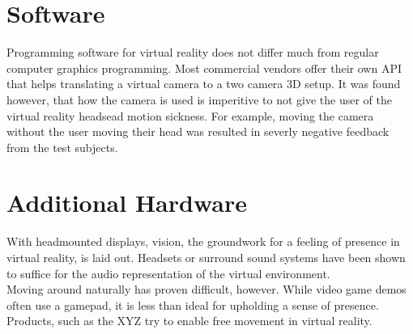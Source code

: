 \documentclass[11pt]{report}
\begin{document}
	\section{Software}
		Programming software for virtual reality does not differ much from regular computer graphics programming. Most commercial vendors offer their own API that helps translating a virtual camera to a two camera 3D setup. It was found however, that how the camera is used is imperitive to not give the user of the virtual reality headsead motion sickness. For example, moving the camera without the user moving their head was resulted in severly negative feedback from the test subjects.
	
	\section{Additional Hardware}
	With headmounted displays, vision, the groundwork for a feeling of presence in virtual reality, is laid out. Headsets or surround sound systems have been shown to suffice for the audio representation of the virtual environment.\\
	Moving around naturally has proven difficult, however. While video game demos often use a gamepad, it is less than ideal for upholding a sense of presence. Products, such as the XYZ try to enable free movement in virtual reality.



	
	
	
	
\end{document}
